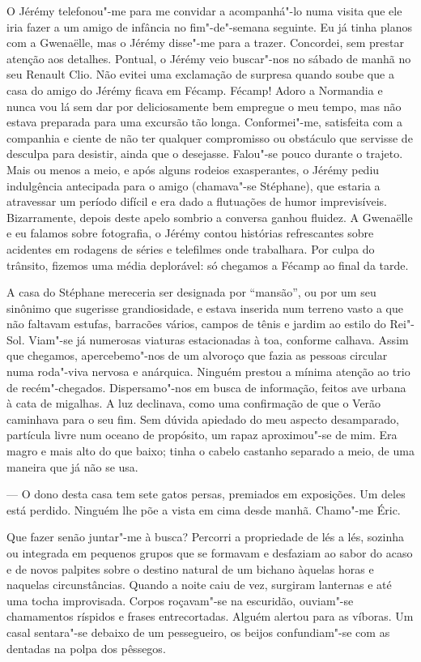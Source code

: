 O Jérémy telefonou"-me para me convidar a acompanhá"-lo numa visita que
ele iria fazer a um amigo de infância no fim"-de"-semana seguinte. Eu já tinha planos com a Gwenaëlle, mas o Jérémy
disse"-me para a trazer. Concordei, sem prestar atenção aos detalhes.
Pontual, o Jérémy veio buscar"-nos no sábado de manhã no seu Renault
Clio. Não evitei uma exclamação de surpresa quando soube que a casa do
amigo do Jérémy ficava em Fécamp. Fécamp! Adoro a Normandia e nunca vou
lá sem dar por deliciosamente bem empregue o meu tempo, mas não estava
preparada para uma excursão tão longa. Conformei"-me, satisfeita com a
companhia e ciente de não ter qualquer compromisso ou obstáculo que
servisse de desculpa para desistir, ainda que o desejasse. Falou"-se pouco durante o trajeto. Mais ou menos a meio, e após alguns rodeios
exasperantes, o Jérémy pediu indulgência antecipada para o amigo
(chamava"-se Stéphane), que estaria a atravessar um período difícil e era
dado a flutuações de humor imprevisíveis. Bizarramente, depois deste
apelo sombrio a conversa ganhou fluidez. A Gwenaëlle e eu falamos sobre
fotografia, o Jérémy contou histórias refrescantes sobre acidentes em
rodagens de séries e telefilmes onde trabalhara. Por culpa
do trânsito, fizemos uma média deplorável: só chegamos a Fécamp ao final
da tarde.

A casa do Stéphane mereceria ser designada por ``mansão'', ou por um
seu sinônimo que sugerisse grandiosidade, e estava inserida num terreno
vasto a que não faltavam estufas, barracões vários, campos de tênis e
jardim ao estilo do Rei"-Sol. Viam"-se já numerosas viaturas estacionadas à toa, conforme
calhava. Assim que chegamos, apercebemo"-nos de um alvoroço que fazia as
pessoas circular numa roda"-viva nervosa e anárquica. Ninguém prestou a
mínima atenção ao trio de recém"-chegados. Dispersamo"-nos em busca de
informação, feitos ave urbana à cata de migalhas. A luz declinava,
como uma confirmação de que o Verão caminhava para o seu fim. Sem dúvida
apiedado do meu aspecto desamparado, partícula livre num oceano de
propósito, um rapaz aproximou"-se de mim. Era magro e mais alto do que
baixo; tinha o cabelo castanho separado a meio, de uma maneira que já
não se usa.

--- O dono desta casa tem sete gatos persas, premiados em exposições. Um
deles está perdido. Ninguém lhe põe a vista em cima desde manhã.
Chamo"-me Éric.

Que fazer senão juntar"-me à busca? Percorri a propriedade de lés a
lés, sozinha ou integrada em pequenos grupos que se formavam e desfaziam
ao sabor do acaso e de novos palpites sobre o destino natural de um
bichano àquelas horas e naquelas circunstâncias. Quando a noite caiu de
vez, surgiram lanternas e até uma tocha improvisada. Corpos roçavam"-se
na escuridão, ouviam"-se chamamentos ríspidos e frases entrecortadas.
Alguém alertou para as víboras. Um casal sentara"-se debaixo de um
pessegueiro, os beijos confundiam"-se com as dentadas na polpa dos
pêssegos.

